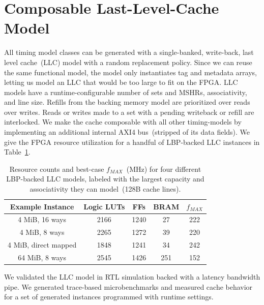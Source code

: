 \section{Composable Last-Level-Cache Model}
All timing model classes can be generated with a single-banked, write-back,
last level cache~(LLC) model with a random replacement policy.  Since we can
reuse the same functional model, the model only instantiates tag and metadata
arrays, letting us model an LLC that would be too
large to fit on the FPGA. \PNAME LLC models have a runtime-configurable number of sets
and MSHRs, associativity, and line size. Refills from the backing memory model
are prioritized over reads over writes. Reads or writes made to a set with a
pending writeback or refill are interlocked.  We make the cache composable with
all other timing-models by implementing an additional internal AXI4
bus~(stripped of its data fields). We give the FPGA resource utilization for a
handful of LBP-backed LLC instances in
Table~\ref{tbl:llc-model-resources}.
\begin{table}[htb]
\centering
    \begin{tabular}{c c c c c}
	\hline
        \textbf{Example Instance} & Logic LUTs & FFs & BRAM & $f_{MAX}$ \\
	\hline
        4 MiB, 16 ways & 2166 & 1240 & 27 & 222 \\
        4 MiB, 8 ways  & 2265 & 1272 & 39 & 220 \\
        4 MiB, direct mapped & 1848 & 1241 & 34 & 242 \\
        64 MiB, 8 ways & 2545 & 1426 & 251 & 152 \\
	\hline
	\end{tabular}
    \caption{Resource counts and best-case $f_{MAX}$~(MHz) for four different
    LBP-backed LLC models, labeled with the largest capacity and associativity they can model~(128B cache lines).}
\label{tbl:llc-model-resources}
\end{table}

We validated the LLC model in RTL simulation backed with a latency bandwidth
pipe. We generated trace-based microbenchmarks and measured cache behavior
for a set of generated instances programmed with runtime settings.
